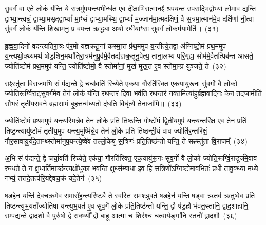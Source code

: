 {\anuvakamend[{ए॒तच्छ॒म्बट्कु॑र्वन्ति॒ तेषा॒ञ्चतु॑स्त्रिꣳशच्च}]}%

सु॒व॒र्गं वा ए॒ते लो॒कं य॑न्ति॒ ये स॒त्रमु॑प॒यन्त्य॒भीन्ध॑त ए॒व दी॒क्षाभि॑रा॒त्मानꣴ॑ श्रपयन्त उप॒सद्भि॒र्द्वाभ्यां॒ लोमाव॑ द्यन्ति॒ द्वाभ्या॒न्त्वचं॒ द्वाभ्या॒मसृ॒द्द्वाभ्यां᳚ मा॒ꣳ॒सं द्वाभ्या॒मस्थि॒ द्वाभ्यां᳚ म॒ज्जान॑मा॒त्मद॑क्षिणं॒ वै स॒त्रमा॒त्मान॑मे॒व दक्षि॑णां नी॒त्वा सु॑व॒र्गं लो॒कं य॑न्ति॒ शिखा॒मनु॒ प्र व॑पन्त॒ ऋद्ध्या॒ अथो॒ रघी॑याꣳसः सुव॒र्गं लो॒कम॑या॒मेति॑॥~(३१)

{\anuvakamend[{सु॒व॒र्गं प॑ञ्चा॒शत्}]}%

ब्र॒ह्म॒वा॒दिनो॑ वदन्त्यतिरा॒त्रः प॑र॒मो य॑ज्ञक्रतू॒नां कस्मा॒त्तं प्र॑थ॒ममुप॑ य॒न्तीत्ये॒तद्वा अ॑ग्निष्टो॒मं प्र॑थ॒ममुप॑ य॒न्त्यथो॒क्थ्य॑मथ॑ षोड॒शिन॒मथा॑तिरा॒त्रम॑नुपू॒र्वमे॒वैतद्य॑ज्ञक्र॒तूनु॒पेत्य॒ ताना॒लभ्य॑ परि॒गृह्य॒ सोम॑मे॒वैतत्पिब॑न्त आसते॒ ज्योति॑ष्टोमं प्रथ॒ममुप॑ यन्ति॒ ज्योति॑ष्टोमो॒ वै स्तोमा॑नां॒ मुखं॑ मुख॒त ए॒व स्तोमा॒न्प्र यु॑ञ्जते॒ ते~(३२)

सꣴस्तु॑ता वि॒राज॑म॒भि सं प॑द्यन्ते॒ द्वे चर्चा॒वति॑ रिच्येते॒ एक॑या॒ गौरति॑रिक्त॒ एक॒यायु॑रू॒नः सु॑व॒र्गो वै लो॒को ज्योति॒रूर्ग्वि॒राट्सु॑व॒र्गमे॒व तेन॑ लो॒कं य॑न्ति रथन्त॒रं दिवा॒ भव॑ति रथन्त॒रं नक्त॒मित्या॑हुर्ब्रह्मवा॒दिनः॒ केन॒ तदजा॒मीति॑ सौभ॒रं तृ॑तीयसव॒ने ब्र॑ह्मसा॒मं बृ॒हत्तन्म॑ध्य॒तो द॑धति॒ विधृ॑त्यै॒ तेनाजा॑मि॥~(३३)

{\anuvakamend[{त एका॒न्नप॑ञ्चा॒शच्च॑}]}%

ज्योति॑ष्टोमं प्रथ॒ममुप॑ यन्त्य॒स्मिन्ने॒व तेन॑ लो॒के प्रति॑ तिष्ठन्ति॒ गोष्टो॑मं द्वि॒तीय॒मुप॑ यन्त्य॒न्तरि॑क्ष ए॒व तेन॒ प्रति॑ तिष्ठ॒न्त्यायु॑ष्टोमं तृ॒तीय॒मुप॑ यन्त्य॒मुष्मि॑न्ने॒व तेन॑ लो॒के प्रति॑ तिष्ठन्ती॒यं वाव ज्योति॑र॒न्तरि॑क्षं॒ गौर॒सावायु॒र्यदे॒तान्थ्स्तोमा॑नुप॒यन्त्ये॒ष्वे॑व तल्लो॒केषु॑ स॒त्रिणः॑ प्रति॒तिष्ठ॑न्तो यन्ति॒ ते सꣴस्तु॑ता वि॒राजम्᳚~(३४)

अ॒भि सं प॑द्यन्ते॒ द्वे चर्चा॒वति॑ रिच्येते॒ एक॑या॒ गौरति॑रिक्त॒ एक॒यायु॑रू॒नः सु॑व॒र्गो वै लो॒को ज्योति॒रूर्ग्वि॒राडूर्ज॑मे॒वाव॑ रुन्धते॒ ते न क्षु॒धार्ति॒मार्च्छ॒न्त्यक्षो॑धुका भवन्ति॒ क्षुथ्स॑म्बाधा इव॒ हि स॒त्रिणो᳚\-ऽग्निष्टो॒माव॒भितः॑ प्र॒धी तावु॒क्थ्या॑ मध्ये॒ नभ्यं॒ तत्तदे॒तत्प॑रि॒यद्दे॑वच॒क्रं यदे॒तेन॑~(३५)

ष॒ड॒हेन॒ यन्ति॑ देवच॒क्रमे॒व स॒मारो॑ह॒न्त्यरि॑ष्ट्यै॒ ते स्व॒स्ति सम॑श्ञुवते षड॒हेन॑ यन्ति॒ षड्वा ऋ॒तव॑ ऋ॒तुष्वे॒व प्रति॑ तिष्ठन्त्युभ॒यतो᳚ज्योतिषा यन्त्युभ॒यत॑ ए॒व सु॑व॒र्गे लो॒के प्र॑ति॒तिष्ठ॑न्तो यन्ति॒ द्वौ ष॑ड॒हौ भ॑वत॒स्तानि॒ द्वाद॒शाहा॑नि॒ सम्प॑द्यन्ते द्वाद॒शो वै पुरु॑षो॒ द्वे स॒क्थ्यौ᳚ द्वौ बा॒हू आ॒त्मा च॒ शिर॑श्च च॒त्वार्यङ्गा॑नि॒ स्तनौ᳚ द्वाद॒शौ~(३६)

